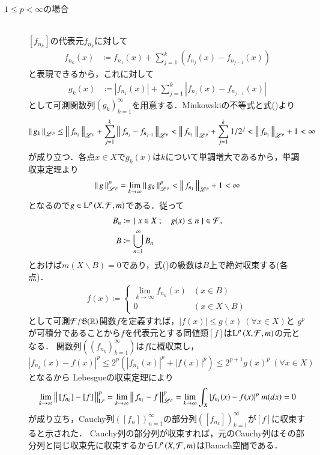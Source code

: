 \begin{prf}
\begin{description}
		\item[$1 \leq p < \infty$の場合]\mbox{}\\
			$[f_{n_k}]$の代表元$f_{n_k}$に対して
			\begin{align}	
				f_{n_k}(x) &\coloneqq f_{n_1}(x) + \sum_{j=1}^{k}(f_{n_j}(x) - f_{n_{j-1}}(x)) \label{eq:Lp_banach_3}
			\end{align}
			と表現できるから，これに対して
			\begin{align}
				g_k(x) &\coloneqq |f_{n_1}(x)| + \sum_{j=1}^{k}|f_{n_j}(x) - f_{n_{j-1}}(x)|
			\end{align}
			として可測関数列$(g_k)_{k=1}^{\infty}$を用意する．Minkowskiの不等式と式()より
			\begin{align}
				\left\|\, g_k\, \right\|_{\mathscr{L}^p} \leq \left\|\, f_{n_1}\, \right\|_{\mathscr{L}^p} + \sum_{j=1}^{k}\left\|\, f_{n_j} - f_{n_{j-1}}\, \right\|_{\mathscr{L}^p}
				< \left\|\, f_{n_1}\, \right\|_{\mathscr{L}^p} + \sum_{j=1}^{k} 1/2^j < \left\|\, f_{n_1}\, \right\|_{\mathscr{L}^p} + 1 < \infty
			\end{align}
			が成り立つ．各点$x \in X$で$g_k(x)$は$k$について単調増大であるから，単調収束定理より
			\begin{align}
				\left\|\, g\, \right\|_{\mathscr{L}^p}^p = \lim_{k \to \infty} \left\|\, g_k\, \right\|_{\mathscr{L}^p}^p < \left\|\, f_{n_1}\, \right\|_{\mathscr{L}^p} + 1 < \infty
			\end{align}
			となるので$g \in \operatorname{L}^{p} \left(X,\mathcal{F},m\right)$である．従って
			\begin{align}
				B_n &\coloneqq \left\{\ x \in X\ ;\quad g(x) \leq n\ \right\} \in \mathcal{F}, \\
				B &\coloneqq \bigcup_{n=1}^{\infty} B_n
			\end{align}
			とおけば$m(X \backslash B) = 0$であり，式()の級数は$B$上で絶対収束する(各点)．
			\begin{align}
				f(x) \coloneqq
				\begin{cases}
					\lim\limits_{k \to \infty} f_{n_k}(x) & (x \in B) \\
					0 & (x \in X \backslash B)
				\end{cases}
			\end{align}
			として可測$\mathcal{F}/\mathfrak{B}(\mathbb{R})$関数$f$を定義すれば，$|f(x)| \leq g(x)\ (\forall x \in X)$と
			$g^p$が可積分であることから$f$を代表元とする同値類$[f]$は$\operatorname{L}^{p} \left(X,\mathcal{F},m\right)$の元となる．
			関数列$(\left( f_{n_k} \right)_{k=1}^{\infty})$は$f$に概収束し，
			$|f_{n_k}(x) - f(x)|^p \leq 2^p(|f_{n_k}(x)|^p + |f(x)|^p) \leq 2^{p+1} g(x)^p\ (\forall x \in X)$となるから
			Lebesgueの収束定理により
			\begin{align}
				\lim_{k \to \infty}\Norm{[f_{n_k}] - [f]}{\mathrm{L}^p}^p
				= \lim_{k \to \infty}\Norm{f_{n_k} - f}{\mathscr{L}^p}^p
				= \lim_{k \to \infty} \int_X |f_{n_k}(x) - f(x)|^p\ m(dx) = 0
			\end{align}
			が成り立ち，Cauchy列$\left( [f_{n}] \right)_{n=1}^{\infty}$の部分列$\left( [f_{n_k}] \right)_{k=1}^{\infty}$が$[f]$に収束すると示された．
			Cauchy列の部分列が収束すれば，元のCauchy列はその部分列と同じ収束先に収束するから$\operatorname{L}^{p} \left(X,\mathcal{F},m\right)$はBanach空間である．
	\end{description}
	\QED
\end{prf}
